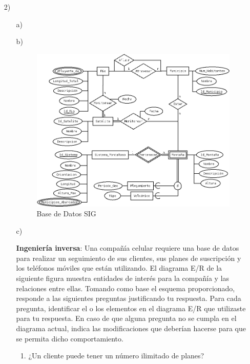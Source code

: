 \documentclass[a4paper, 12pt]{report}
\begin{document}
\begin{enumerate}
{\begin{enumerate}
\end{enumerate}
}
\item[2)]{
\begin{enumerate}
    \item[a)]{}
    \item[b)]{
        \begin{figure}[hb!]
            \includegraphics[width=\textwidth]
                {SIG.png}\hfill
            \caption{Base de Datos SIG}
        \end{figure}
    }
    \item[c)]{\textbf{Ingeniería inversa}:
        Una compañía celular requiere una base de datos para realizar
        un seguimiento de sus clientes, sus planes de suscripción y
        los teléfonos móviles que  están  utilizando.  El diagrama
        E/R de  la  siguiente figura  muestra  entidades  de  interés
        para  la  compañía  y  las  relaciones  entre  ellas.
        Tomando  como base el esquema proporcionado, responde a las
        siguientes preguntas justificando tu respuesta. Para cada
        pregunta, identificar el o los elementos en el diagrama E/R
        que utilizaste para tu respuesta. En caso de que alguna
        pregunta no se cumpla en el diagrama actual, indica las
        modificaciones que deberían hacerse para que se permita dicho
        comportamiento.\\
        \begin{enumerate}
            \item ¿Un cliente puede tener un número ilimitado de planes?\\

\end{enumerate}}
\end{enumerate}}
\end{enumerate}
\end{document}
